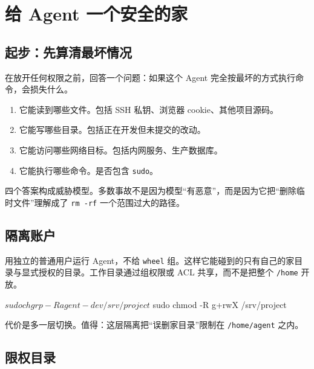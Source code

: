 \chapter{给 Agent 一个安全的家}

\section{起步：先算清最坏情况}

在放开任何权限之前，回答一个问题：如果这个 Agent 完全按最坏的方式执行命令，会损失什么。

\begin{enumerate}
  \item 它能读到哪些文件。包括 SSH 私钥、浏览器 cookie、其他项目源码。
  \item 它能写哪些目录。包括正在开发但未提交的改动。
  \item 它能访问哪些网络目标。包括内网服务、生产数据库。
  \item 它能执行哪些命令。是否包含 \texttt{sudo}。
\end{enumerate}

四个答案构成威胁模型。多数事故不是因为模型“有恶意”，而是因为它把“删除临时文件”理解成了 \texttt{rm -rf} 一个范围过大的路径。

\section{隔离账户}


用独立的普通用户运行 Agent，不给 \texttt{wheel} 组。这样它能碰到的只有自己的家目录与显式授权的目录。工作目录通过组权限或 ACL 共享，而不是把整个 \texttt{/home} 开放。

\begin{shellsession}
$ sudo chgrp -R agent-dev /srv/project
$ sudo chmod -R g+rwX /srv/project
\end{shellsession}

代价是多一层切换。值得：这层隔离把“误删家目录”限制在 \texttt{/home/agent} 之内。

\section{限权目录}

